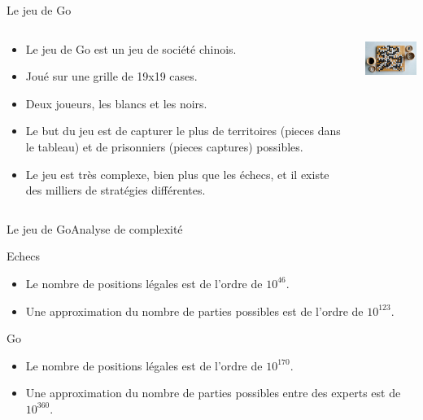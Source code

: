 \begin{frame}{Le jeu de Go}
    \begin{block}{}
        \begin{columns}
            \begin{column}{8cm}
                \begin{itemize}
                    \item Le jeu de Go est un jeu de société chinois.
                    \item Joué sur une grille de 19x19 cases.
                    \item Deux joueurs, les blancs et les noirs.
                    \item Le but du jeu est de capturer le plus de territoires (pieces dans le tableau) et de prisonniers (pieces captures) possibles.
                    \item Le jeu est très complexe, bien plus que les échecs, et il existe des milliers de stratégies différentes.
                \end{itemize}
            \end{column}
            \begin{column}{3cm}
                \includegraphics[width=3cm]{ressources/Go/Go_tableau}
            \end{column}
        \end{columns}
    \end{block}
\end{frame}


\begin{frame}{Le jeu de Go}{Analyse de complexité}
    \begin{block}{Echecs}
        \begin{itemize}
            \item Le nombre de positions légales est de l'ordre de $10^{46}$.
            \item Une approximation du nombre de parties possibles est de l'ordre de $10^{123}$.
        \end{itemize}
    \end{block}
    \pause
    \begin{alertblock}{Go}
        \begin{itemize}
            \item Le nombre de positions légales est de l'ordre de $10^{170}$.
            \item Une approximation du nombre de parties possibles entre des experts est de $10^{360}$.
        \end{itemize}
    \end{alertblock}
\end{frame}

